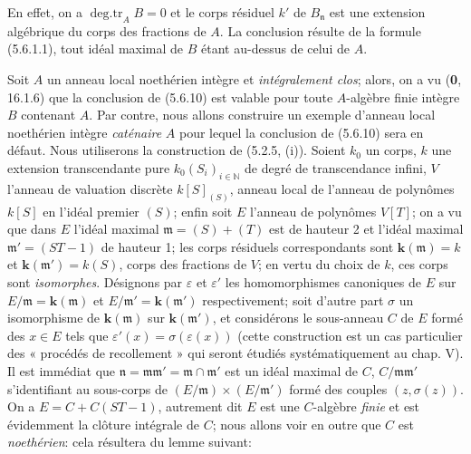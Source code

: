 En effet, on a $\operatorname{deg.tr}_A B=0$ et le corps résiduel $k'$ de
$B_{\mathfrak n}$ est une extension algébrique du corps des fractions de
$A$. La conclusion résulte de la formule (5.6.1.1), tout idéal maximal de
$B$ étant au-dessus de celui de $A$.

\begin{example}[5.6.11]
\label{IV.2.s5.6.11-fr}
Soit $A$ un anneau local noethérien intègre et \emph{intégralement clos}; alors, on
a vu (\textbf{0}, 16.1.6) que la conclusion de (5.6.10) est valable pour toute
$A$-algèbre finie intègre $B$ contenant $A$. Par contre, nous allons
construire un exemple d'anneau local noethérien intègre \emph{caténaire} $A$ pour
lequel la conclusion de (5.6.10) sera en défaut. Nous utiliserons la
construction de (5.2.5, (i)). Soient $k_0$ un corps, $k$ une extension
transcendante pure $k_0(S_i)_{i\in\mathbb N}$ de degré de transcendance
infini, $V$ l'anneau de valuation discrète $k[S]_{(S)}$, anneau local de
l'anneau de polynômes $k[S]$ en l'idéal premier $(S)$; enfin soit $E$
l'anneau de polynômes $V[T]$; on a vu que dans $E$ l'idéal maximal
$\mathfrak m=(S)+(T)$ est de hauteur 2 et l'idéal maximal
$\mathfrak m'=(ST-1)$ de hauteur 1;
les corps résiduels correspondants sont $\boldsymbol{k}(\mathfrak m)=k$ et
$\boldsymbol{k}(\mathfrak m')=k(S)$, corps des fractions de $V$; en vertu du choix de
$k$, ces corps sont \emph{isomorphes}. Désignons par $\varepsilon$ et
$\varepsilon'$ les homomorphismes canoniques de $E$ sur
$E/\mathfrak m=\boldsymbol{k}(\mathfrak m)$ et $E/\mathfrak m'=\boldsymbol{k}(\mathfrak m')$
respectivement; soit d'autre part $\sigma$ un isomorphisme de
$\boldsymbol{k}(\mathfrak m)$ sur $\boldsymbol{k}(\mathfrak m')$, et considérons le sous-anneau $C$
de $E$ formé des $x\in E$ tels que
$\varepsilon'(x)=\sigma(\varepsilon(x))$ (cette construction est un cas
particulier des « procédés de recollement » qui seront étudiés
systématiquement au chap. V). Il est immédiat que
$\mathfrak n=\mathfrak m\mathfrak m'=\mathfrak m\cap\mathfrak m'$ est un
idéal maximal de $C$, $C/\mathfrak m\mathfrak m'$ s'identifiant au
sous-corps de $(E/\mathfrak m)\times(E/\mathfrak m')$ formé des couples
$(z,\sigma(z))$. On a $E=C+C(ST-1)$, autrement dit $E$ est une
$C$-algèbre \emph{finie} et est évidemment la clôture intégrale de $C$; nous allons
voir en outre que $C$ est \emph{noethérien}: cela résultera du lemme suivant:


\end{example}
